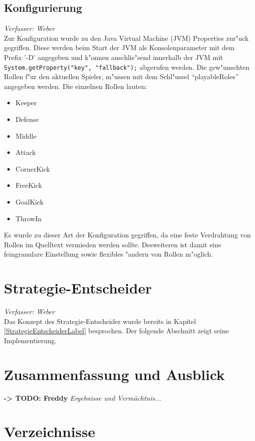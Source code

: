 \documentclass[fontsize=12pt,a4paper,final]{scrartcl}[2003/01/01]
\begin{document}
\subsection{Konfigurierung}
\textit{Verfasser: Weber}\\
Zur Konfiguration wurde zu den Java Virtual Machine (JVM) Properties zur"uck gegriffen. Diese werden beim Start der JVM als Konsolenparameter mit dem Prefix '-D' angegeben und k"onnen anschlie"send innerhalb der JVM mit \lstinline$System.getProperty("key", "fallback");$ abgerufen werden. Die gew"unschten Rollen f"ur den aktuellen Spieler, m"ussen mit dem Schl"ussel ``playableRoles'' angegeben werden. Die einzelnen Rollen lauten:

\begin{itemize}
\item Keeper
\item Defense
\item Middle
\item Attack
\item CornerKick
\item FreeKick
\item GoalKick
\item ThrowIn
\end{itemize}

Es wurde zu dieser Art der Konfiguration gegriffen, da eine feste Verdrahtung von Rollen im Quelltext vermieden werden sollte. Desweiteren ist damit eine feingranulare Einstellung sowie flexibles "andern von Rollen m"oglich.

\section{Strategie-Entscheider}
\textit{Verfasser: Weber}\\
Das Konzept des Strategie-Entscheider wurde bereits in Kapitel \ref{StrategieEntscheiderLabel} besprochen. Der folgende Abschnitt zeigt seine Implementierung.\\

\section{Zusammenfassung und Ausblick}
\textbf{-> TODO: Freddy}
\textit{Ergebnisse und Vermächtnis...}

\section{Verzeichnisse}
\listoffigures
\end{document}
